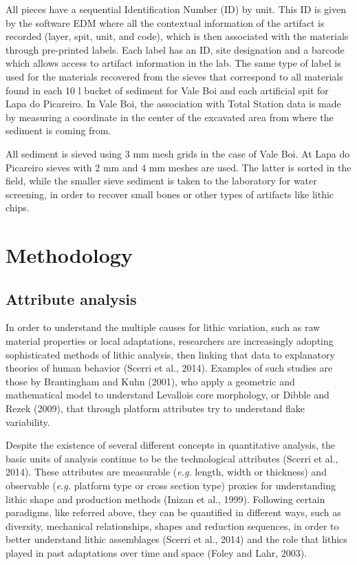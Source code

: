 \documentclass[12pt,twoside]{reedthesis}
\begin{document}
All pieces have a sequential Identification Number (ID) by unit. This ID is given by the software EDM where all the contextual information of the artifact is recorded (layer, spit, unit, and code), which is then associated with the materials through pre-printed labels. Each label has an ID, site designation and a barcode which allows access to artifact information in the lab. The same type of label is used for the materials recovered from the sieves that correspond to all materials found in each 10 l bucket of sediment for Vale Boi and each artificial spit for Lapa do Picareiro. In Vale Boi, the association with Total Station data is made by measuring a coordinate in the center of the excavated area from where the sediment is coming from.

All sediment is sieved using 3 mm mesh grids in the case of Vale Boi. At Lapa do Picareiro sieves with 2 mm and 4 mm meshes are used. The latter is sorted in the field, while the smaller sieve sediment is taken to the laboratory for water screening, in order to recover small bones or other types of artifacts like lithic chips.

\hypertarget{methodology}{%
\chapter{Methodology}\label{methodology}}

\hypertarget{attribute-analysis}{%
\section{Attribute analysis}\label{attribute-analysis}}

In order to understand the multiple causes for lithic variation, such as raw material properties or local adaptations, researchers are increasingly adopting sophisticated methods of lithic analysis, then linking that data to explanatory theories of human behavior (Scerri et al., 2014). Examples of such studies are those by Brantingham and Kuhn (2001), who apply a geometric and mathematical model to understand Levallois core morphology, or Dibble and Rezek (2009), that through platform attributes try to understand flake variability.

Despite the existence of several different concepts in quantitative analysis, the basic units of analysis continue to be the technological attributes (Scerri et al., 2014). These attributes are measurable (\emph{e.g.} length, width or thickness) and observable (\emph{e.g.} platform type or cross section type) proxies for understanding lithic shape and production methods (Inizan et al., 1999). Following certain paradigms, like referred above, they can be quantified in different ways, such as diversity, mechanical relationships, shapes and reduction sequences, in order to better understand lithic assemblages (Scerri et al., 2014) and the role that lithics played in past adaptations over time and space (Foley and Lahr, 2003).
\end{document}

